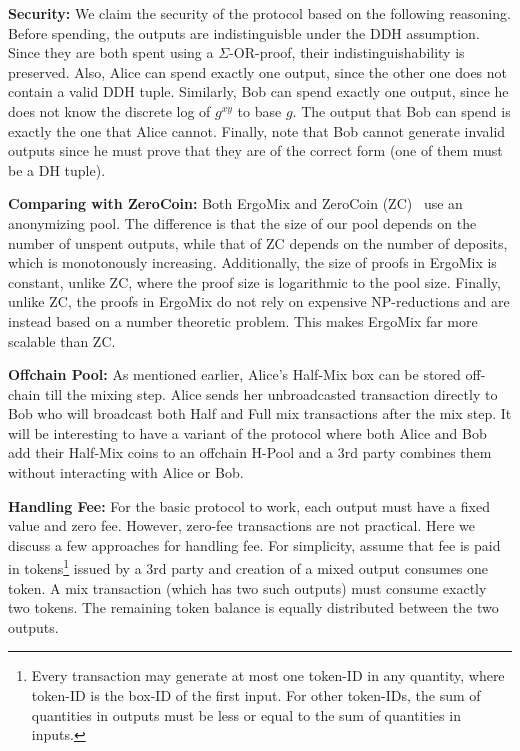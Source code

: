 \documentclass[11pt]{article}
\newcommand{\mixname}{ErgoMix\xspace}
\begin{document}
\textbf{Security:} We claim the security of the protocol based on the following reasoning. Before spending, the outputs are indistinguisble under the DDH assumption. Since they are both spent using a $\Sigma$-OR-proof, their indistinguishability is preserved. Also, Alice can spend exactly one output, since the other one does not contain a valid DDH tuple. Similarly, Bob can spend exactly one output, since he does not know the discrete log of $g^{xy}$ to base $g$. The output that Bob can spend is exactly the one that Alice cannot. Finally, note that Bob cannot generate invalid outputs since he must prove that they are of the correct form (one of them must be a DH tuple). 

\textbf{Comparing with ZeroCoin:} Both \mixname and ZeroCoin (ZC)~\cite{zerocoin} use an anonymizing pool. The difference is that the size of our pool depends on the number of unspent outputs, while that of ZC depends on the number of deposits, which is monotonously increasing. Additionally, the size of proofs in \mixname is constant, unlike ZC, where the proof size is logarithmic to the pool size. Finally, unlike ZC, the proofs in \mixname do not rely on expensive NP-reductions and are instead based on a number theoretic problem. This makes \mixname far more scalable than ZC. 

\textbf{Offchain Pool:} As mentioned earlier, Alice's Half-Mix box can be stored off-chain till the mixing step. Alice sends her unbroadcasted transaction directly to Bob who will broadcast both Half and Full mix transactions after the mix step. It will be interesting to have a variant of the protocol where both Alice and Bob add their Half-Mix coins to an offchain H-Pool and a 3rd party combines them without interacting with Alice or Bob. 

\textbf{Handling Fee:} 
For the basic protocol to work, each output must have a fixed value and zero fee. However, zero-fee transactions are not practical. Here we discuss a few approaches for handling fee. For simplicity, assume that fee is paid in tokens\footnote{
	 Every transaction may generate at most one token-ID in any quantity, where token-ID is the box-ID of the first input. For other token-IDs, the sum of quantities in outputs must be less or equal to the sum of quantities in inputs.} issued by a 3rd party and creation of a mixed output consumes one token. A mix transaction (which has two such outputs) must consume exactly two tokens. The remaining token balance is equally distributed between the two outputs.  
\end{document}
